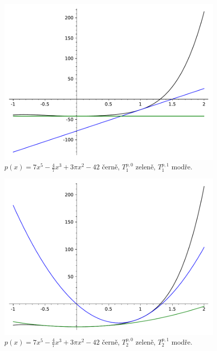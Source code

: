 \begin{enumerate}
{			\begin{figure}[H]
				\centering
				\includegraphics{cviceni_10/fig/taylor_pol_1.pdf}
				\caption{$p(x) = 7x^5 - \frac{4}{7} x^3 + 3\pi x^2 - 42$ černě, $T_1^{p, 0}$ zeleně, $T_1^{p, 1}$ modře.}
				\label{fig:taylor_1_pol}
			\end{figure}

			\begin{figure}[H]
				\centering
				\includegraphics{cviceni_10/fig/taylor_pol_2.pdf}
				\caption{$p(x) = 7x^5 - \frac{4}{7} x^3 + 3\pi x^2 - 42$ černě, $T_2^{p, 0}$ zeleně, $T_2^{p, 1}$ modře.}
				\label{fig:taylor_2_pol}
			\end{figure}

}
\end{enumerate}
